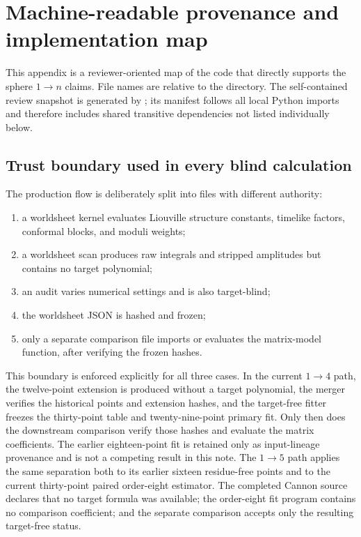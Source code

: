 \documentclass[11pt]{article}
\begin{document}
\appendix
\section{Machine-readable provenance and implementation map}
\label{sec:code-map}

This appendix is a reviewer-oriented map of the code that directly supports
the sphere $1\to n$ claims.  File names are relative to the 
directory.  The self-contained review snapshot is generated by
; its manifest follows all local
Python imports and therefore includes shared transitive dependencies not
listed individually below.

\subsection{Trust boundary used in every blind calculation}

The production flow is deliberately split into files with different
authority:
\begin{enumerate}
  \item a worldsheet kernel evaluates Liouville structure constants,
  timelike factors, conformal blocks, and moduli weights;
  \item a worldsheet scan produces raw integrals and stripped amplitudes but
  contains no target polynomial;
  \item an audit varies numerical settings and is also target-blind;
  \item the worldsheet JSON is hashed and frozen;
  \item only a separate comparison file imports or evaluates the
  matrix-model function, after verifying the frozen hashes.
\end{enumerate}
This boundary is enforced explicitly for all three cases.  In the current
$1\to4$ path, the twelve-point extension is produced without a target
polynomial, the merger verifies the historical points and extension hashes,
and the target-free fitter freezes the thirty-point table and
twenty-nine-point primary fit.  Only then does the downstream comparison
verify those hashes and evaluate the matrix coefficients.  The earlier
eighteen-point fit is retained only as input-lineage provenance and is not a
competing result in this note.
The $1\to5$ path applies the same separation both to its earlier sixteen
residue-free points and to the current thirty-point paired order-eight
estimator.  The completed Cannon source declares that no target formula was
available; the order-eight fit program contains no comparison coefficient;
and the separate comparison accepts only the resulting target-free status.
\end{document}
